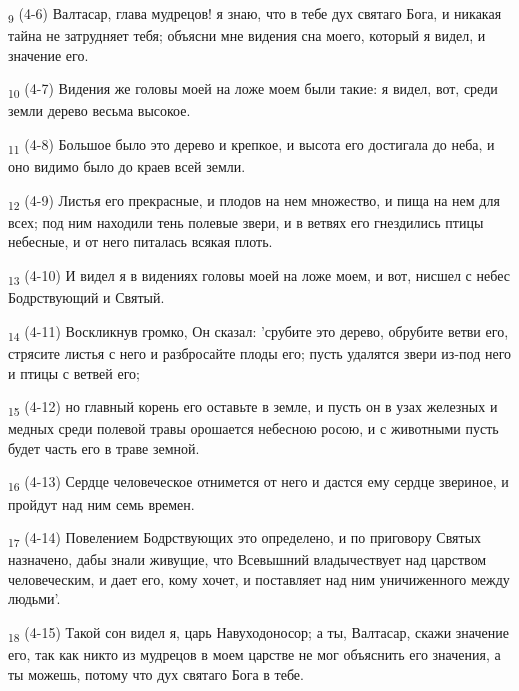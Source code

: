 \begin{tcolorbox}
\textsubscript{9} (4-6) Валтасар, глава мудрецов! я знаю, что в тебе дух святаго Бога, и никакая тайна не затрудняет тебя; объясни мне видения сна моего, который я видел, и значение его.
\end{tcolorbox}
\begin{tcolorbox}
\textsubscript{10} (4-7) Видения же головы моей на ложе моем были такие: я видел, вот, среди земли дерево весьма высокое.
\end{tcolorbox}
\begin{tcolorbox}
\textsubscript{11} (4-8) Большое было это дерево и крепкое, и высота его достигала до неба, и оно видимо было до краев всей земли.
\end{tcolorbox}
\begin{tcolorbox}
\textsubscript{12} (4-9) Листья его прекрасные, и плодов на нем множество, и пища на нем для всех; под ним находили тень полевые звери, и в ветвях его гнездились птицы небесные, и от него питалась всякая плоть.
\end{tcolorbox}
\begin{tcolorbox}
\textsubscript{13} (4-10) И видел я в видениях головы моей на ложе моем, и вот, нисшел с небес Бодрствующий и Святый.
\end{tcolorbox}
\begin{tcolorbox}
\textsubscript{14} (4-11) Воскликнув громко, Он сказал: 'срубите это дерево, обрубите ветви его, стрясите листья с него и разбросайте плоды его; пусть удалятся звери из-под него и птицы с ветвей его;
\end{tcolorbox}
\begin{tcolorbox}
\textsubscript{15} (4-12) но главный корень его оставьте в земле, и пусть он в узах железных и медных среди полевой травы орошается небесною росою, и с животными пусть будет часть его в траве земной.
\end{tcolorbox}
\begin{tcolorbox}
\textsubscript{16} (4-13) Сердце человеческое отнимется от него и дастся ему сердце звериное, и пройдут над ним семь времен.
\end{tcolorbox}
\begin{tcolorbox}
\textsubscript{17} (4-14) Повелением Бодрствующих это определено, и по приговору Святых назначено, дабы знали живущие, что Всевышний владычествует над царством человеческим, и дает его, кому хочет, и поставляет над ним уничиженного между людьми'.
\end{tcolorbox}
\begin{tcolorbox}
\textsubscript{18} (4-15) Такой сон видел я, царь Навуходоносор; а ты, Валтасар, скажи значение его, так как никто из мудрецов в моем царстве не мог объяснить его значения, а ты можешь, потому что дух святаго Бога в тебе.
\end{tcolorbox}
